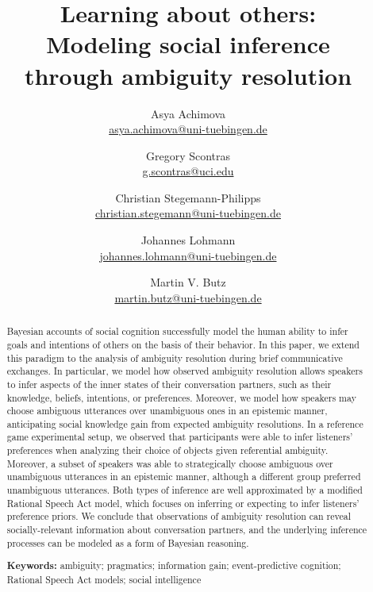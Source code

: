 \documentclass[11pt,a4paper]{article}
\title{Learning about others:\\
	Modeling social inference \\ through ambiguity resolution
}
\author{
		Asya Achimova\\
		\href{mailto:asya.achimova@uni-tuebingen.de}{asya.achimova@uni-tuebingen.de}
	\and
		Gregory Scontras\\
		\href{mailto:g.scontras@uci.edu}{g.scontras@uci.edu}
	\and 
		Christian Stegemann-Philipps\\
		\href{mailto:christian.stegemann@uni-tuebingen.de}{christian.stegemann@uni-tuebingen.de}
	\and
		Johannes Lohmann\\
		\href{mailto:johannes.lohmann@uni-tuebingen.de}{johannes.lohmann@uni-tuebingen.de}
	\and
		Martin V. Butz \\
		\href{mailto:martin.butz@uni-tuebingen.de}{martin.butz@uni-tuebingen.de}
}
\begin{document}
\maketitle

\begin{abstract}
Bayesian accounts of social cognition successfully model the human ability to infer goals and intentions of others on the basis of their behavior.
In this paper, we extend this paradigm to the analysis of ambiguity resolution during brief communicative exchanges. 
In particular, we model how observed ambiguity resolution allows speakers to infer aspects of the inner states of
their conversation partners, such as their knowledge, beliefs, intentions, or preferences.
Moreover, we model how speakers may choose ambiguous utterances over unambiguous ones in an epistemic manner, anticipating social knowledge gain from expected ambiguity resolutions. 
In a reference game experimental setup, we observed that participants were able to infer listeners' preferences when analyzing their choice of objects given referential ambiguity.
Moreover, a subset of speakers was able to strategically choose ambiguous over unambiguous utterances in an epistemic manner, although a different group preferred unambiguous utterances. 
Both types of inference are well approximated by a modified Rational Speech Act model, which focuses on inferring or expecting to infer listeners' preference priors.
We conclude that observations of ambiguity resolution can reveal socially-relevant information about conversation partners, and the underlying inference processes can be modeled as a form of Bayesian reasoning. 
                                                                 

\textbf{Keywords:} 
ambiguity; pragmatics; information gain; event-predictive cognition; Rational Speech Act models; social intelligence
\end{abstract}
\end{document}
